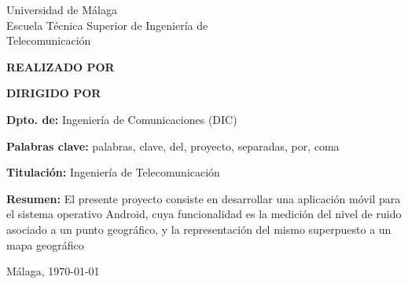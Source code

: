 
\thispagestyle{empty}
\begin{center}
	\Large \sffamily
	Universidad de Málaga\\
	Escuela Técnica Superior de Ingeniería de\\
	Telecomunicación
\end{center}

\bigskip

\begin{center}
	\Huge\scshape
	\pfctitlename
\end{center}

\bigskip

\begin{center}
	\textbf{REALIZADO POR}\\
	\textsf{\pfcauthorname}
\end{center}

\medskip

\begin{center}
	\textbf{DIRIGIDO POR}\\
	\textsf{\pfctutorname}
\end{center}

\vfill

\begin{minipage}{\textwidth}
\textbf{Dpto. de:} Ingeniería de Comunicaciones (DIC)

\medskip

\textbf{Palabras clave:} palabras, clave, del, proyecto, separadas, por, coma

\medskip

\textbf{Titulación:} Ingeniería de Telecomunicación

\medskip

\textbf{Resumen:}
	El presente proyecto consiste en desarrollar una aplicación móvil para el sistema operativo Android, cuya funcionalidad es la medición del nivel de ruido asociado a un punto geográfico, y la representación del mismo superpuesto a un mapa geográfico

\begin{center} Málaga, \today\end{center}
\end{minipage}

\blankpage